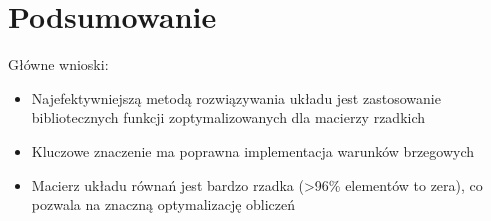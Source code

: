 \documentclass[12pt,a4paper]{article}
\begin{document}
\section{Podsumowanie}

Główne wnioski:
\begin{itemize}
    \item Najefektywniejszą metodą rozwiązywania układu jest zastosowanie bibliotecznych funkcji zoptymalizowanych dla macierzy rzadkich
    \item Kluczowe znaczenie ma poprawna implementacja warunków brzegowych
    \item Macierz układu równań jest bardzo rzadka (>96\% elementów to zera), co pozwala na znaczną optymalizację obliczeń
\end{itemize}
\end{document}
